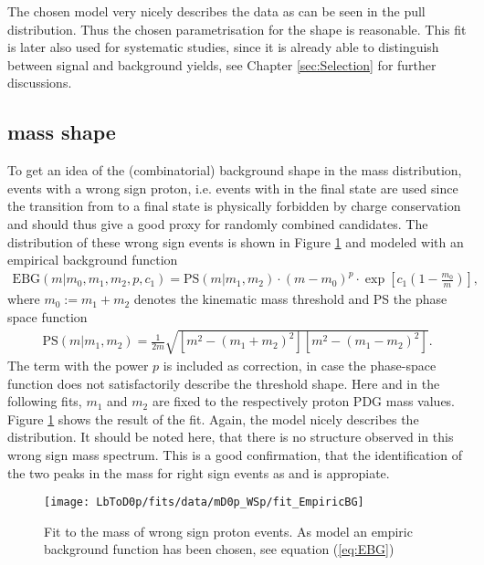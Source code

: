 The chosen model very nicely describes the data as can be seen in the pull distribution.
Thus the chosen parametrisation for the \logIP shape is reasonable.
This fit is later also used for systematic studies, since it is already able to distinguish between signal and background yields, see Chapter \ref{sec:Selection} for further discussions.

\subsection{\Dz\proton mass shape}
\label{sec:Shape_mD0p}
To get an idea of the (combinatorial) background shape in the \Dz\proton mass distribution, events with a wrong sign proton, i.e. events with \Dz\antiproton\mun in the final state are used since the transition from \Lb to a \Dz\antiproton\mun final state is physically forbidden by charge
conservation and should thus give a good proxy for randomly combined \LbToDpmunu candidates. 
The \MDp distribution of these wrong sign events is shown in Figure \ref{fig:fit_mD0p_WS} and modeled with an empirical background function \cite{EBG}
\begin{align}
    \text{EBG}(m|m_0, m_1, m_2, p,c_1) = \text{PS}(m|m_1,m_2) \cdot (m - m_0)^p \cdot \exp\left[ c_1 \left(1-\frac{m_0}{m}\right)\right], \label{eq:EBG}
\end{align}
where $m_0 := m_1 + m_2$ denotes the kinematic \Dz\proton mass threshold and PS the phase space function
\begin{align}
    \text{PS}(m|m_1,m_2) = \frac{1}{2m} \sqrt{\left[m^2 - (m_1 + m_2)^2\right] \left[m^2 - (m_1 - m_2)^2\right]}. \label{eq:PS}
\end{align}
The term with the power $p$ is included as correction, in case the phase-space function does not satisfactorily describe the threshold shape.
Here and in the following fits, $m_1$ and $m_2$ are fixed to the \Dz respectively proton PDG mass values.
Figure \ref{fig:fit_mD0p_WS} shows the result of the fit.
Again, the model nicely describes the distribution.
It should be noted here, that there is no structure observed in this wrong sign mass spectrum.
This is a good confirmation, that the identification of the two peaks in the \Dz\proton mass for right sign events as \LcResI and \LcResII is appropiate.
\begin{figure}[tbp]
    \centering
	\texttt{[image: LbToD0p/fits/data/mD0p\_WSp/fit\_EmpiricBG]}
	\caption{Fit to the \Dz\proton mass of wrong sign proton events.
             As model an empiric background function has been chosen, see equation (\ref{eq:EBG})}
    \label{fig:fit_mD0p_WS}
\end{figure}

